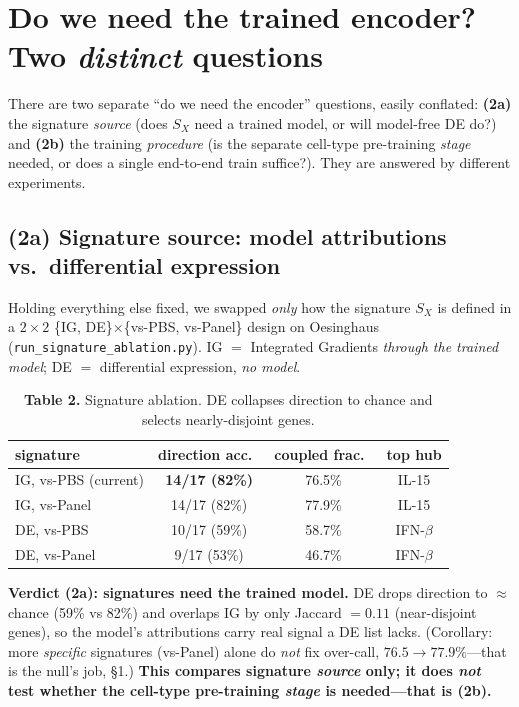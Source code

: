 \documentclass[11pt]{article}
\begin{document}
\section{Do we need the trained encoder? Two \emph{distinct} questions}
There are two separate ``do we need the encoder'' questions, easily conflated: \textbf{(2a)} the signature \emph{source} (does $S_X$ need a trained model, or will model-free DE do?) and \textbf{(2b)} the training \emph{procedure} (is the separate cell-type pre-training \emph{stage} needed, or does a single end-to-end train suffice?). They are answered by different experiments.

\subsection*{(2a) Signature source: model attributions vs.\ differential expression}
Holding everything else fixed, we swapped \emph{only} how the signature $S_X$ is defined in a $2\times2$ \{IG, DE\}$\times$\{vs-PBS, vs-Panel\} design on Oesinghaus (\texttt{run\_signature\_ablation.py}). IG $=$ Integrated Gradients \emph{through the trained model}; DE $=$ differential expression, \emph{no model}.

\begin{table}[h]\centering\small
\caption*{\textbf{Table 2.} Signature ablation. DE collapses direction to chance and selects nearly-disjoint genes.}
\begin{tabular}{lccc}
\toprule
signature & direction acc.\ & coupled frac.\ & top hub \\
\midrule
\rowcolor{hl}IG, vs-PBS (current) & \textbf{14/17 (82\%)} & 76.5\% & IL-15 \\
IG, vs-Panel & 14/17 (82\%) & 77.9\% & IL-15 \\
DE, vs-PBS & 10/17 (59\%) & 58.7\% & IFN-$\beta$ \\
DE, vs-Panel & 9/17 (53\%) & 46.7\% & IFN-$\beta$ \\
\bottomrule
\end{tabular}
\end{table}

\textbf{Verdict (2a): signatures need the trained model.} DE drops direction to $\approx$chance (59\% vs 82\%) and overlaps IG by only Jaccard $=0.11$ (near-disjoint genes), so the model's attributions carry real signal a DE list lacks. (Corollary: more \emph{specific} signatures (vs-Panel) alone do \emph{not} fix over-call, $76.5\to77.9\%$---that is the null's job, \S1.) \textbf{This compares signature \emph{source} only; it does \emph{not} test whether the cell-type pre-training \emph{stage} is needed---that is (2b).}
\end{document}
